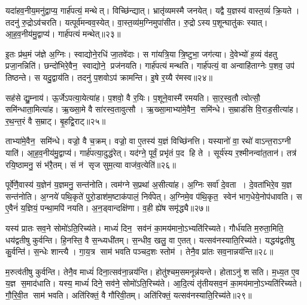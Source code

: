 यदा॑हव॒नीय॒मनु॑द्वाप्य॒ गार्\mbox{}ह॑पत्यं॒ मन्थेत्।
विच्छि॑न्द्यात्।
भ्रातृ॑व्यमस्मै जनयेत्।
यद्वै य॒ज्ञस्य॑ वास्त॒व्यं॑ क्रि॒यते।
तदनु॑ रु॒द्रोऽव॑चरति।
यत्पूर्व॑मन्वव॒स्येत्।
वा॒स्त॒व्य॑म॒ग्निमुपा॑सीत।
रु॒द्रोऽस्य प॒शून्घातु॑कः स्यात्।
आ॒ह॒व॒नीय॑मु॒द्वाप्य॑।
गार्\mbox{}ह॑पत्यं मन्थेत्॥२३॥

इ॒तः प्र॑थ॒मं ज॑ज्ञे अ॒ग्निः।
स्वाद्योने॒रधि॑ जा॒तवे॑दाः।
स गा॑यत्रि॒या त्रि॒ष्टुभा॒ जग॑त्या।
दे॒वेभ्यो॑ ह॒व्यं व॑हतु प्रजा॒नन्निति॑।
छन्दो॑भिरे॒वैन॒ स्वाद्योने॒ प्रज॑नयति।
गार्\mbox{}ह॑पत्यं मन्थति।
गार्\mbox{}ह॑पत्यं॒ वा अन्वाहि॑ताग्नेः प॒शव॒ उप॑ तिष्ठन्ते।
स यदु॒द्वाय॑ति।
तदनु॑ प॒शवोऽप॑ क्रामन्ति।
इ॒षे र॒य्यै र॑मस्व॥२४॥

सह॑से द्यु॒म्नाय॑।
ऊ॒र्जेऽपत्या॒येत्या॑ह।
प॒शवो॒ वै र॒यिः।
प॒शूने॒वास्मै॑ रमयति।
सा॒र॒स्व॒तौ त्वोत्सौ॒ समि॑न्धाता॒मित्या॑ह।
ऋ॒ख्सा॒मे वै सा॑रस्व॒तावुत्सौ।
ऋ॒ख्सा॒माभ्या॑मे॒वैन॒ समि॑न्धे।
स॒म्राड॑सि वि॒राड॒सीत्या॑ह।
र॒थ॒न्त॒रं वै स॒म्राट्।
बृ॒हद्वि॒राट्॥२५॥

ताभ्या॑मे॒वैन॒ समि॑न्धे।
वज्रो॒ वै च॒क्रम्।
वज्रो॒ वा ए॒तस्य॑ य॒ज्ञं विच्छि॑नत्ति।
यस्यानो॑ वा॒ रथो॑ वाऽन्त॒राऽग्नी याति॑।
आ॒ह॒व॒नीय॑मु॒द्वाप्य॑।
गार्\mbox{}ह॑पत्या॒दुद्ध॑रेत्।
यद॑ग्ने॒ पूर्वं॒ प्रभृ॑तं प॒द हि ते।
सूर्य॑स्य र॒श्मीनन्वा॑त॒तान॑।
तत्र॑ रयि॒ष्ठामनु॒ सं भ॑रै॒तम्।
सं न॑ सृज सुम॒त्या वाज॑व॒त्येति॑॥२६॥

पूर्वे॑णै॒वास्य॑ य॒ज्ञेन॑ य॒ज्ञमनु॒ सन्त॑नोति।
त्वम॑ग्ने स॒प्रथा॑ अ॒सीत्या॑ह।
अ॒ग्निः सर्वा॑ दे॒वता।
दे॒वता॑भिरे॒व य॒ज्ञ सन्त॑नोति।
अ॒ग्नये॑ पथि॒कृते॑ पुरो॒डाश॑म॒ष्टाक॑पालं॒ निर्व॑पेत्।
अ॒ग्निमे॒व प॑थि॒कृत॒ स्वेन॑ भाग॒धेये॒नोप॑धावति।
स ए॒वैनं॑ य॒ज्ञियं॒ पन्था॒मपि॑ नयति।
अ॒न॒ड्वान्दक्षि॑णा।
व॒ही ह्ये॑ष समृ॑द्ध्यै॥२७॥

यस्य॑ प्रातः सव॒ने सोमो॑ऽति॒रिच्य॑ते।
माध्यं॑ दिन॒ सव॑नं का॒मय॑मानो॒ऽभ्यति॑रिच्यते।
गौर्ध॑यति म॒रुता॒मिति॒ धय॑द्वतीषु कुर्वन्ति।
हि॒नस्ति॒ वै स॒न्ध्यधी॑तम्।
स॒न्धीव॒ खलु॒ वा ए॒तत्।
यत्सव॑नस्याति॒रिच्य॑ते।
यद्धय॑द्वतीषु कु॒र्वन्ति॑।
स॒न्धेः शान्त्यै।
गा॒य॒त्र साम॑ भवति पञ्चद॒शः स्तोम॑।
तेनै॒व प्रा॑तः सव॒नान्नय॑न्ति॥२८॥

म॒रुत्व॑तीषु कुर्वन्ति।
तेनै॒व माध्यं॑ दिना॒त्सव॑ना॒न्नय॑न्ति।
होतु॑श्चम॒समनून्न॑यन्ते।
होताऽनु॑ शसति।
म॒ध्य॒त ए॒व य॒ज्ञ स॒माद॑धाति।
यस्य॒ माध्यं॑ दिने॒ सव॑ने॒ सोमो॑ऽति॒रिच्य॑ते।
आ॒दि॒त्यं तृ॑तीयसव॒नं का॒मय॑मानो॒ऽभ्यति॑रिच्यते।
गौ॒रि॒वी॒त साम॑ भवति।
अति॑रिक्तं॒ वै गौ॑रिवी॒तम्।
अति॑रिक्तं॒ यत्सव॑नस्याति॒रिच्य॑ते॥२९॥

